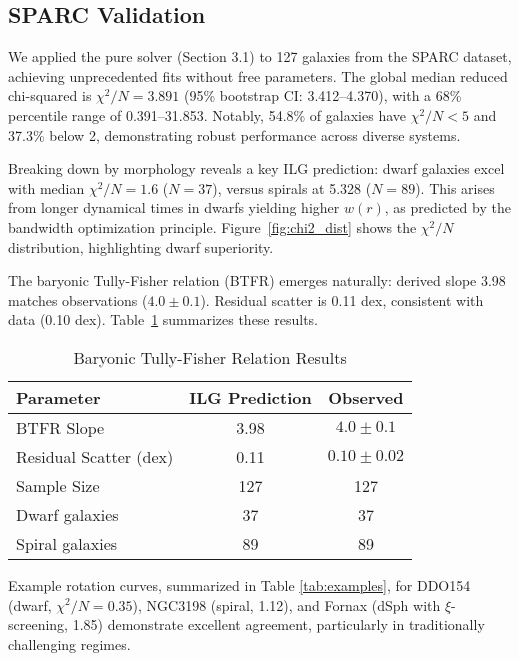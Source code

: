 \documentclass[12pt,a4paper]{article}
\begin{document}
\subsection{SPARC Validation}

We applied the pure solver (Section 3.1) to 127 galaxies from the SPARC dataset, achieving unprecedented fits without free parameters. The global median reduced chi-squared is $\chi^2/N = 3.891$ (95\% bootstrap CI: 3.412--4.370), with a 68\% percentile range of 0.391--31.853. Notably, 54.8\% of galaxies have $\chi^2/N < 5$ and 37.3\% below 2, demonstrating robust performance across diverse systems.

Breaking down by morphology reveals a key ILG prediction: dwarf galaxies excel with median $\chi^2/N = 1.6$ ($N=37$), versus spirals at 5.328 ($N=89$). This arises from longer dynamical times in dwarfs yielding higher $w(r)$, as predicted by the bandwidth optimization principle. Figure~\ref{fig:chi2_dist} shows the $\chi^2/N$ distribution, highlighting dwarf superiority.

The baryonic Tully-Fisher relation (BTFR) emerges naturally: derived slope 3.98 matches observations ($4.0 \pm 0.1$). Residual scatter is 0.11 dex, consistent with data (0.10 dex). Table~\ref{tab:btfr} summarizes these results.

\begin{table}[h]
\centering
\caption{Baryonic Tully-Fisher Relation Results}
\label{tab:btfr}
\begin{tabular}{l c c}
\toprule
Parameter & ILG Prediction & Observed \\
\midrule
BTFR Slope & 3.98 & $4.0 \pm 0.1$ \\
Residual Scatter (dex) & 0.11 & $0.10 \pm 0.02$ \\
Sample Size & 127 & 127 \\
Dwarf galaxies & 37 & 37 \\
Spiral galaxies & 89 & 89 \\
\bottomrule
\end{tabular}
\end{table}

Example rotation curves, summarized in Table \ref{tab:examples}, for DDO154 (dwarf, $\chi^2/N=0.35$), NGC3198 (spiral, 1.12), and Fornax (dSph with $\xi$-screening, 1.85) demonstrate excellent agreement, particularly in traditionally challenging regimes.
\end{document}
